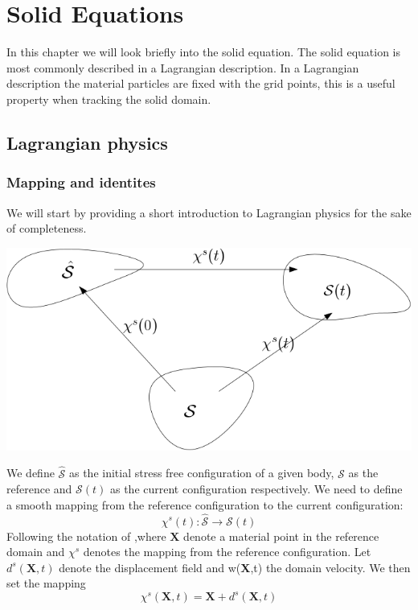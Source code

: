 \chapter{Solid Equations}
In this chapter we will look briefly into the solid equation. The solid equation is most commonly described in a Lagrangian description. In a Lagrangian description the material particles are fixed with the grid points, this is a useful property when tracking the solid domain.

\section*{Lagrangian physics}
\subsection*{Mapping and identites}
We will start by providing a short introduction to Lagrangian physics for the sake of completeness.
\begin{center}
\includegraphics[scale=0.4]{continuum_mapping.png}
\end{center}
We define $ \hat{\mathcal{S}}$ as the initial stress free configuration of a given body, $\mathcal{S}$ as the reference and $\mathcal{S}(t)$ as the current configuration respectively.
We need to define a smooth mapping from the reference configuration to the current configuration:
\begin{equation}
\chi^s(t) : \hat{\mathcal{S}} \rightarrow \mathcal{S}(t)     
\end{equation}
Following the notation of \cite{Holzapfel2000},where $\textbf{X}$ denote a material point in the reference domain and $\chi^s$ denotes the mapping from the reference configuration. 
Let $d^s(\textbf{X},t)$ denote the displacement field and w(\textbf{X},t) the domain velocity. We then set the mapping
\begin{equation}
 \chi^s(\textbf{X},t) = \textbf{X}  + d^s(\textbf{X} ,t) 
\end{equation}

